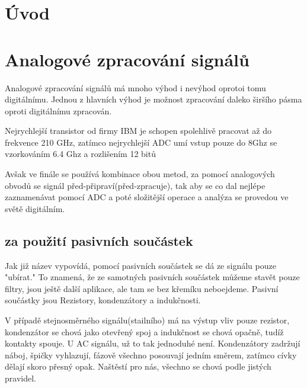 \documentclass[oneside,12pt,a4paper]{template/SPSTemplate} %
\begin{document}
	\makebeginning

	\tableofcontents
	
	\chapter{Úvod}
	
	\chapter{Analogové zpracování signálů}
		Analogové zpracování signálů má mnoho výhod i nevýhod oprotoi tomu digitálnímu. Jednou z hlavních výhod je možnost zpracování daleko širšího pásma oproti digitálnímu zpracován. 

		Nejrychlejší transistor od firmy IBM je schopen spolehlivě pracovat až do frekvence 210 GHz, zatímco nejrychlejší ADC umí vstup pouze do 8Ghz se vzorkováním 6.4 Ghz a rozlišením 12 bitů \cite{(http://www.ti.com/product/adc12dl3200).}

		Avšak ve finále se používá kombinace obou metod, za pomocí analogových obvodů se signál před-připraví(před-zpracuje), tak aby se co dal nejlépe zaznamenávat pomocí ADC a poté složitější operace a analýza se provedou ve světě digitálním.

		\section{za použití pasivních součástek}
			Jak již název vypovídá, pomocí pasivních součástek se dá ze signálu pouze "ubírat." To znamená, že ze samotných pasivních součástek můžeme stavět pouze filtry, jsou ještě další aplikace, ale tam se bez křemíku neboejdeme.
			Pasivní součástky jsou Rezistory, kondenzátory a indukčnosti.

			V případě stejnosměrného signálu(stailního) má na výstup vliv pouze rezistor, kondenzátor se chová jako otevřený spoj a indukčnost se chová opačně, tudíž kontakty spouje.
			U AC signálu, už to tak jednoduhé není. Kondenzátory zadržují náboj, špičky vyhlazují, fázově všechno posouvají jedním směrem, zatímco cívky dělají skoro přesný opak. Naštěstí pro nás, všechno se chová podle jistých pravidel.
\end{document}
